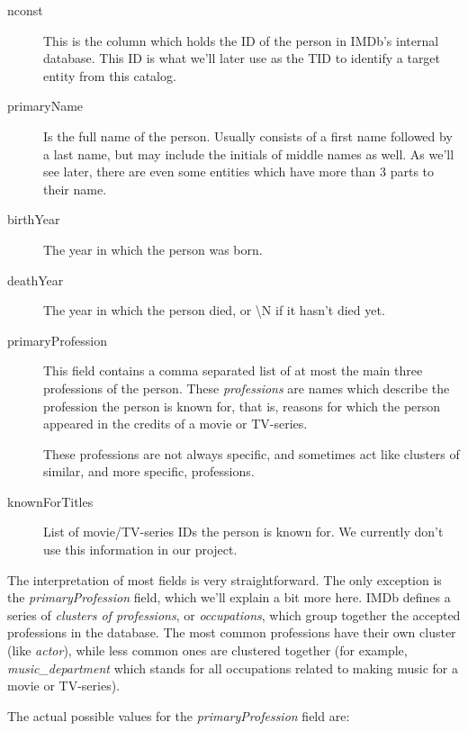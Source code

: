 \documentclass[epsfig,a4paper,11pt,titlepage,twoside,openany]{book}
\begin{document}
\begin{description}
\item[nconst] This is the column which holds the ID of the person in IMDb's internal database. This ID is what we'll later use as the TID to identify a target entity from this catalog.

\item[primaryName] Is the full name of the person. Usually consists of a first name followed by a last name, but may include the initials of middle names as well. As we'll see later, there are even some entities which have more than 3 parts to their name.

\item[birthYear] The year in which the person was born.

\item[deathYear] The year in which the person died, or \textbackslash{}N if it hasn't died yet.

\item[primaryProfession] This field contains a comma separated list of at most the main three professions of the person. These \textit{professions} are names which describe the profession the person is known for, that is, reasons for which the person appeared in the credits of a movie or TV-series. 

These professions are not always specific, and sometimes act like clusters of similar, and more specific, professions.

\item[knownForTitles] List of movie/TV-series IDs the person is known for. We currently don't use this information in our project. 
\end{description}

The interpretation of most fields is very straightforward. The only exception is the \textit{primaryProfession} field, which we'll explain a bit more here. IMDb defines a series of \textit{clusters of professions}, or \textit{occupations}, which group together the accepted professions in the database. The most common professions have their own cluster (like \textit{actor}), while less common ones are clustered together (for example, \textit{music\_department} which stands for all occupations related to making music for a movie or TV-series).

The actual possible values for the \textit{primaryProfession} field are: 
\end{document}
